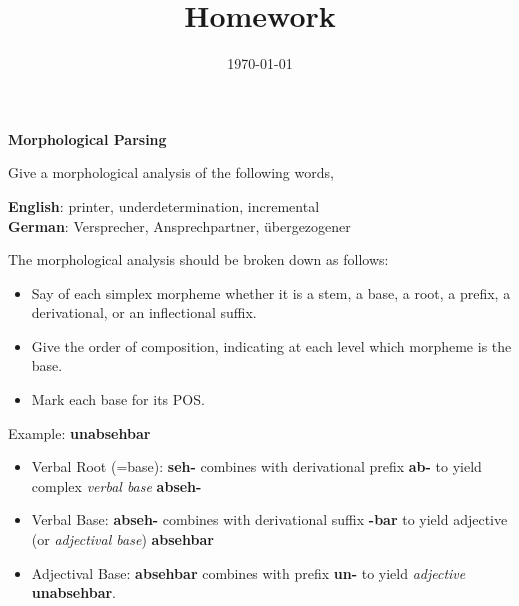 \documentclass[11pt]{article}
\title{Homework \hwnumber} %
\author{\myname} %
\date{\textbf{\mycourse} \hfill {\today} \hfill \textbf{\semesteryear}} %
\begin{document}
\thispagestyle{empty} %

\clearpage %
\maketitle


\begin{problem}{1}
\textbf{Morphological Parsing}

Give a morphological analysis of the following words,
\begin{tcolorbox}
	\textbf{English}: printer, underdetermination, incremental \\
	\textbf{German}: Versprecher, Ansprechpartner, übergezogener
\end{tcolorbox}

The morphological analysis should be broken down as follows:
\begin{itemize}
	\item Say of each simplex morpheme whether it is a stem, a base, a root, a prefix, a derivational, or an inflectional suffix.
	\item Give the order of composition, indicating at each level which morpheme is the base.
	\item Mark each base for its POS.

\end{itemize}


Example: \textbf{unabsehbar}
\begin{itemize}
	\item Verbal Root (=base): \textbf{seh-} combines with derivational prefix \textbf{ab-} to yield complex \textit{verbal base} \textbf{abseh-}

	\item Verbal Base: \textbf{abseh-} combines with derivational suffix \textbf{-bar} to yield adjective (or \textit{adjectival base}) \textbf{absehbar}

	\item Adjectival Base: \textbf{absehbar} combines with prefix \textbf{un-} to yield \textit{adjective} \textbf{unabsehbar}. 
\end{itemize}

\end{problem}
\end{document}
